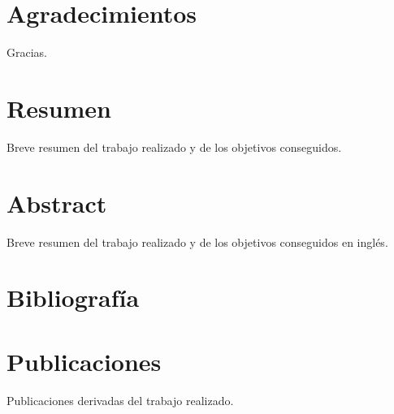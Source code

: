 \documentclass[a4paper,11pt,twoside,openright,spanish]{book}
\makeatletter
\def\cleardoublepage{\clearpage\if@twoside \ifodd\c@page\else
  \vspace*{\fill}
    \thispagestyle{empty}
    \newpage
    \if@twocolumn\hbox{}\newpage\fi\fi\fi}
\makeatother
\begin{document}
\chapter*{Agradecimientos}
\label{sec:Agradecimientos}

\noindent Gracias.


\chapter*{Resumen}
\label{sec:Resumen}
\noindent Breve resumen del trabajo realizado y de los objetivos conseguidos.


\chapter*{Abstract}
\label{sec:Abstract}
\noindent Breve resumen del trabajo realizado y de los objetivos conseguidos en inglés.


\tableofcontents
\listoffigures
\listoftables










\cleardoublepage
{}
\chapter*{Bibliografía}



\newpage
\newpage

\appendix
\chapter{Publicaciones}
\label{ch:publicaciones}

Publicaciones derivadas del trabajo realizado.


\newpage
\newpage
\listoftodos
\end{document}
